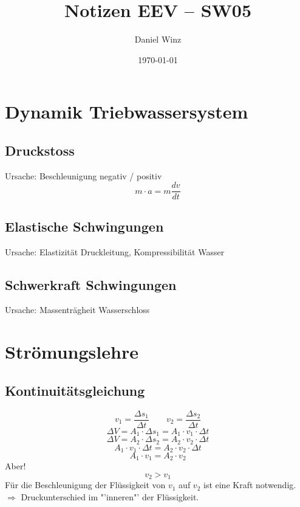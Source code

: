 \documentclass[a4,paper,fleqn]{article}
\title{Notizen EEV -- SW05}
\date{\today}
\author{Daniel Winz}
\begin{document}
\maketitle
\clearpage

\section{Dynamik Triebwassersystem}

\subsection{Druckstoss}
Ursache: Beschleunigung negativ / positiv
\[ m \cdot a = m \frac{dv}{dt} \]

\subsection{Elastische Schwingungen}
Ursache: Elastizität Druckleitung, Kompressibilität Wasser

\subsection{Schwerkraft Schwingungen}
Ursache: Massenträgheit Wasserschloss

\section{Strömungslehre}

\subsection{Kontinuitätsgleichung}
\begin{figure}[h!]
\end{figure}
\[ v_1 = \frac{\Delta s_1}{\Delta t} \qquad v_2 = \frac{\Delta s_2}{\Delta t} \]
\[ \Delta V = A_1 \cdot \Delta s_1 = A_1 \cdot v_1 \cdot \Delta t \]
\[ \Delta V = A_2 \cdot \Delta s_2 = A_2 \cdot v_2 \cdot \Delta t \]
\[ A_1 \cdot v_1 \cdot \Delta t = A_2 \cdot v_2 \cdot \Delta t \]
\[ A_1 \cdot v_1 = A_2 \cdot v_2 \]
Aber! 
\[ v_2 > v_1 \]
Für die Beschleunigung der Flüssigkeit von $v_1$ auf $v_2$ ist eine Kraft 
notwendig. \\
$\Rightarrow$ Druckunterschied im "'inneren"' der Flüssigkeit. 
\end{document}

